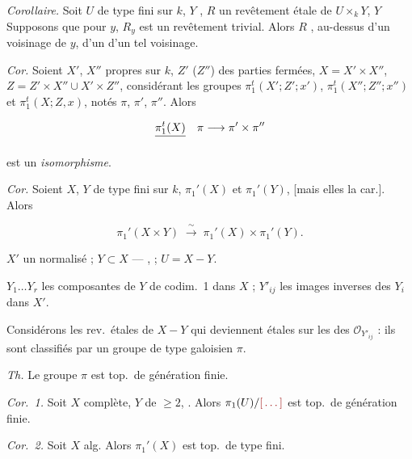 \documentclass[11pt,a4paper]{article}
\begin{document}
\emph{Corollaire.} \struck{\ill{}} Soit $U$ de type fini sur $k$, $Y$
\struck{\ill{}} , $R$ un revêtement étale
 de $U \times_k Y$, \ill{} $Y$ \ill{} Supposons que pour \ill{}
$y$, $R_y$ est un revêtement \ill{} trivial. Alors $R$ \ill{}, \ill{}
au-dessus d'un voisinage de \struck{\ill{}} $y$, \ill{} \ill{} d'un \ill{}
\ill{} d'un tel voisinage.

\emph{Cor.} Soient $X'$, $X''$ propres sur $k$, $Z'$ ($Z''$) des parties
fermées, \ill{} $X = X' \times X''$, $Z = Z' \times X'' \cup X' \times Z''$,
\ill{} considérant les groupes $\pi_1^t(X'; Z'; x')$, $\pi_1^t(X''; Z''; x'')$
et $\pi_1^t(X; Z, x)$, \struck{\ill{}} notés $\pi$, $\pi'$, $\pi''$. Alors

\[ \struck{\pi_1^t(X)} \quad \pi \longrightarrow \pi' \times \pi'' \]

est un \emph{isomorphisme}.

\emph{Cor.} Soient $X$, $Y$ de type fini sur $k$, \ill{}
$\pi_1'(X)$ et $\pi_1'(Y)$,  [mais elles \ill{}
\ill{} la car.]. Alors

\[ \pi_1'(X \times Y) \;\xrightarrow{\ \sim\ }\; \pi_1'(X) \times \pi_1'(Y). \]



$X'$ un normalisé ; \quad $Y \subset X$ --- ,
 ; \quad $U = X - Y$.

$Y_1 \ldots Y_r$ les composantes de $Y$ de codim.\ 1 dans $X$ ;
$Y'_{ij}$ les images inverses des $Y_i$ dans $X'$.

 \quad {} \quad {}

Considérons les rev.\ étales de $X - Y$ qui 
deviennent étales sur les  des $\mathcal{O}_{Y'_{ij}}$ :
ils sont classifiés par un groupe de type galoisien $\pi$.

\emph{Th.} Le groupe $\pi$ est top.\ de génération finie.

\emph{Cor.\ 1.} Soit $X$ \ill{} complète, $Y$ de \ill{} $\geq 2$,
. Alors $\pi_1(U)/\ill{}$ est top.\ de génération finie.

\emph{Cor.\ 2.} Soit $X$  alg. Alors $\pi_1'(X)$ est top.\ de
type fini.
\end{document}
